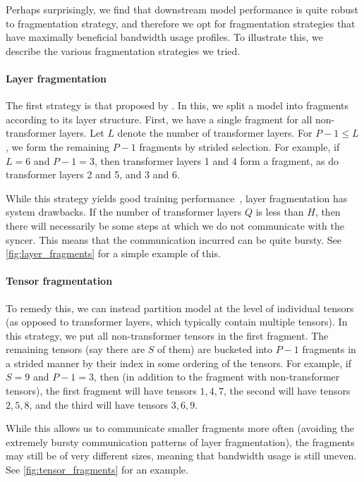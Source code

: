 \documentclass[11pt, a4paper, twocolumn, copyright, google]{google}
\begin{document}
Perhaps surprisingly, we find that downstream model performance is quite robust to fragmentation strategy, and therefore we opt for fragmentation strategies that have maximally beneficial bandwidth usage profiles. To illustrate this, we describe the various fragmentation strategies we tried.

\paragraph{Layer fragmentation}

The first strategy is that proposed by \citet{douillard2025streaming}. In this, we split a model into fragments according to its layer structure. First, we have a single fragment for all non-transformer layers. Let $L$ denote the number of transformer layers. For $P - 1 \leq L$, we form the remaining $P - 1$ fragments by strided selection. For example, if $L = 6$ and $P -1 = 3$, then transformer layers 1 and 4 form a fragment, as do transformer layers 2 and 5, and 3 and 6.

While this strategy yields good training performance~\citep{douillard2025streaming}, layer fragmentation has system drawbacks. If the number of transformer layers $Q$ is less than $H$, then there will necessarily be some steps at which we do not communicate with the syncer. This means that the communication incurred can be quite bursty. See \autoref{fig:layer_fragments} for a simple example of this.

\paragraph{Tensor fragmentation}

To remedy this, we can instead partition model at the level of individual tensors (as opposed to transformer layers, which typically contain multiple tensors). In this strategy, we put all non-transformer tensors in the first fragment. The remaining tensors (say there are $S$ of them) are bucketed into $P - 1$ fragments in a strided manner by their index in some ordering of the tensors. For example, if $S = 9$ and $P - 1 = 3$, then (in addition to the fragment  with non-transformer tensors), the first fragment will have tensors $1, 4, 7$, the second will have tensors $2, 5, 8$, and the third will have tensors $3, 6, 9$. 

While this allows us to communicate smaller fragments more often (avoiding the extremely bursty communication patterns of layer fragmentation), the fragments may still be of very different sizes, meaning that bandwidth usage is still uneven. See \autoref{fig:tensor_fragments} for an example.
\end{document}
